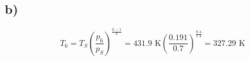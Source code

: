 

\subsection*{b)}

\[
T_6 = T_S \left( \frac{p_6}{p_S} \right)^{\frac{k-1}{k}} = 431.9 \text{ K} \left( \frac{0.191}{0.7} \right)^{\frac{0.4}{1.4}} = 327.29 \text{ K}
\]